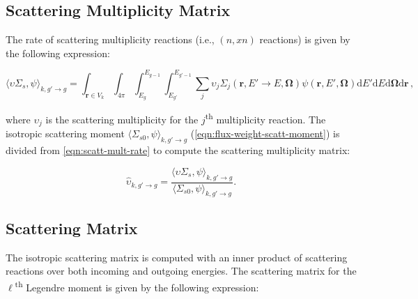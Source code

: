 \subsection{Scattering Multiplicity Matrix}
\label{subsubsec:tally-types-mult-mat}

The rate of scattering multiplicity reactions (\textrm{i.e.}, $(n,xn)$ reactions) is given by the following expression:

\begin{equation}
\label{eqn:scatt-mult-rate}
\langle \upsilon \Sigma_{s}, \psi \rangle_{k,g'\rightarrow g} = \int_{\mathbf{r} \in V_{k}} \int_{4\pi} \int_{E_g}^{E_{g-1}} \int_{E_{g'}}^{E_{g'-1}} \sum_j \upsilon_j \Sigma_j (\mathbf{r}, E' \rightarrow E, \mathbf{\Omega}) \psi(\mathbf{r}, E', \mathbf{\Omega}) \mathrm{d}E'\mathrm{d}E\mathrm{d}\mathbf{\Omega}\mathrm{d}\mathbf{r}\,,
\end{equation}

\noindent where $\upsilon_j$ is the scattering multiplicity for the $j$\textsuperscript{th} multiplicity reaction. The isotropic scattering moment $\langle \Sigma_{s0}, \psi \rangle_{k,g'\rightarrow g}$ (\cref{eqn:flux-weight-scatt-moment}) is divided from \cref{eqn:scatt-mult-rate} to compute the scattering multiplicity matrix:

\begin{equation}
\label{eqn:scatt-mult-mat}
\hat{\upsilon}_{k,g'\rightarrow g} = \frac{{\langle \upsilon \Sigma_{s}, \psi \rangle}_{k,g'\rightarrow g}}{{\langle \Sigma_{s0}, \psi \rangle}_{k,g'\rightarrow g}}.
\end{equation}


\subsection{Scattering Matrix}
\label{subsubsec:tally-types-scatt-mat}

The isotropic scattering matrix is computed with an inner product of scattering reactions over both incoming and outgoing energies. The scattering matrix for the $\ell$\textsuperscript{th} Legendre moment is given by the following expression:



